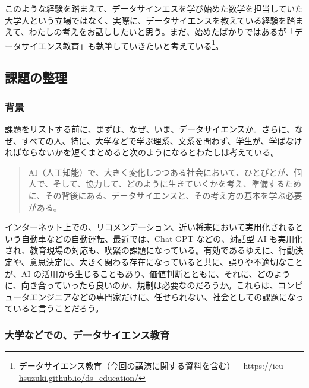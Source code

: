 \documentclass[
]{bxjsbook}
\theoremstyle{definition}
\theoremstyle{definition}
\theoremstyle{definition}
\theoremstyle{definition}
\theoremstyle{remark}
\begin{document}
このような経験を踏まえて、データサインエスを学び始めた数学を担当していた大学人という立場ではなく、実際に、データサイエンスを教えている経験を踏まえて、わたしの考えをお話ししたいと思う。まだ、始めたばかりではあるが「データサイエンス教育」も執筆していきたいと考えている\footnote{データサイエンス教育（今回の講演に関する資料を含む） - \url{https://icu-hsuzuki.github.io/ds_education/}}。

\hypertarget{ux8ab2ux984cux306eux6574ux7406}{%
\subsection{課題の整理}\label{ux8ab2ux984cux306eux6574ux7406}}

\hypertarget{ux80ccux666f}{%
\subsubsection{背景}\label{ux80ccux666f}}

課題をリストする前に、まずは、なぜ、いま、データサイエンスか。さらに、なぜ、すべての人、特に、大学などで学ぶ理系、文系を問わず、学生が、学ばなければならないかを短くまとめると次のようになるとわたしは考えている。

\begin{quote}
AI（人工知能）で、大きく変化しつつある社会において、ひとびとが、個人で、そして、協力して、どのように生きていくかを考え、準備するために、その背後にある、データサイエンスと、その考え方の基本を学ぶ必要がある。
\end{quote}

インターネット上での、リコメンデーション、近い将来において実用化されるという自動車などの自動運転、最近では、Chat GPT などの、対話型 AI も実用化され、教育現場の対応も、喫緊の課題になっている。有効であるゆえに、行動決定や、意思決定に、大きく関わる存在になっていると共に、誤りや不適切なことが、AI の活用から生じることもあり、価値判断とともに、それに、どのように、向き合っていったら良いのか、規制は必要なのだろうか。これらは、コンピュータエンジニアなどの専門家だけに、任せられない、社会としての課題になっていると言うことだろう。

\hypertarget{ux5927ux5b66ux306aux3069ux3067ux306eux30c7ux30fcux30bfux30b5ux30a4ux30a8ux30f3ux30b9ux6559ux80b2}{%
\subsubsection{大学などでの、データサイエンス教育}\label{ux5927ux5b66ux306aux3069ux3067ux306eux30c7ux30fcux30bfux30b5ux30a4ux30a8ux30f3ux30b9ux6559ux80b2}}
\end{document}
